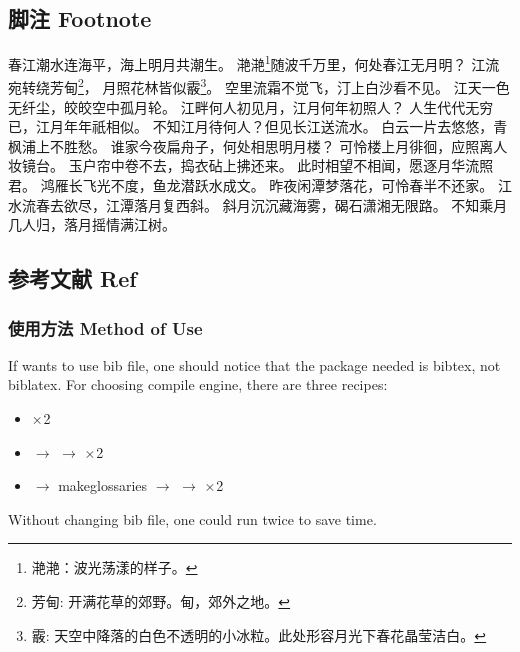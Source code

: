 \documentclass[a4paper]{article}
\begin{document}
    \subsection{脚注 Footnote}
    \begin{center}
        春江潮水连海平，海上明月共潮生。\newline
        滟滟\footnote{滟滟：波光荡漾的样子。}随波千万里，何处春江无月明？\newline
        江流宛转绕芳甸\footnote{芳甸: 开满花草的郊野。甸，郊外之地。}，
        月照花林皆似霰\footnote{霰: 天空中降落的白色不透明的小冰粒。此处形容月光下春花晶莹洁白。}。\newline
        空里流霜不觉飞，汀上白沙看不见。\newline
        江天一色无纤尘，皎皎空中孤月轮。\newline
        江畔何人初见月，江月何年初照人？\newline
        人生代代无穷已，江月年年祇相似。\newline
        不知江月待何人？但见长江送流水。\newline
        白云一片去悠悠，青枫浦上不胜愁。\newline
        谁家今夜扁舟子，何处相思明月楼？\newline
        可怜楼上月徘徊，应照离人妆镜台。\newline
        玉户帘中卷不去，捣衣砧上拂还来。\newline
        此时相望不相闻，愿逐月华流照君。\newline
        鸿雁长飞光不度，鱼龙潜跃水成文。\newline
        昨夜闲潭梦落花，可怜春半不还家。\newline
        江水流春去欲尽，江潭落月复西斜。\newline
        斜月沉沉藏海雾，碣石潇湘无限路。\newline
        不知乘月几人归，落月摇情满江树。\newline
    \end{center}

    \newpage
    \subsection{参考文献 Ref}
    \subsubsection{使用方法 Method of Use}
        If wants to use bib file, one should notice that the package needed is bibtex, not biblatex.
        For choosing compile engine, there are three recipes:
        \begin{itemize}
            \item \XeLaTeX × 2
            \item \XeLaTeX $\rightarrow$ \BibTeX $\rightarrow$ \XeLaTeX × 2
            \item \XeLaTeX $\rightarrow$ makeglossaries $\rightarrow$ \BibTeX $\rightarrow$ \XeLaTeX × 2
        \end{itemize}
        Without changing bib file, one could run \XeLaTeX twice to save time.
\end{document}
